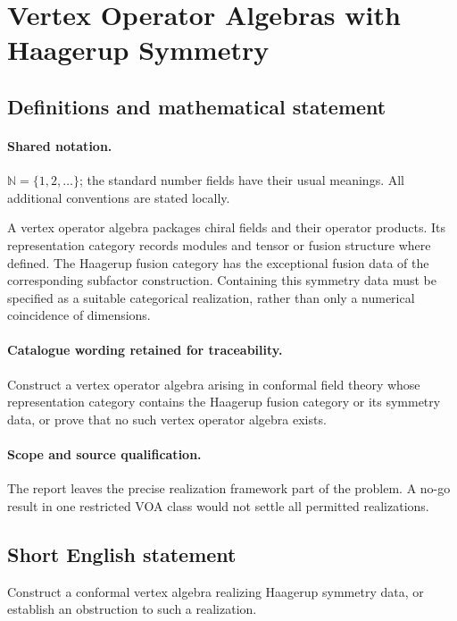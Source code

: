 \documentclass[11pt]{article}
\begin{document}
\section{Vertex Operator Algebras with Haagerup Symmetry}\label{statement}

\subsection{Definitions and mathematical statement}

\paragraph{Shared notation.}$\mathbb N=\{1,2,\ldots\}$; the standard number fields have their usual meanings. All additional conventions are stated locally.


A vertex operator algebra packages chiral fields and their operator products. Its representation category records modules and tensor or fusion structure where defined. The Haagerup fusion category has the exceptional fusion data of the corresponding subfactor construction. Containing this symmetry data must be specified as a suitable categorical realization, rather than only a numerical coincidence of dimensions.

\paragraph{Catalogue wording retained for traceability.}
Construct a vertex operator algebra arising in conformal field theory whose representation category contains the Haagerup fusion category or its symmetry data, or prove that no such vertex operator algebra exists.

\paragraph{Scope and source qualification.}The report leaves the precise realization framework part of the problem. A no-go result in one restricted VOA class would not settle all permitted realizations.
\subsection{Short English statement}
Construct a conformal vertex algebra realizing Haagerup symmetry data, or establish an obstruction to such a realization.
\end{document}
